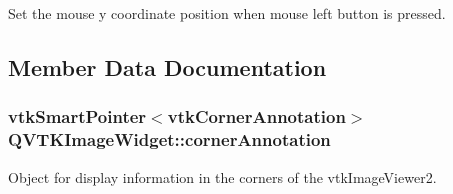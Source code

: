 Set the mouse y coordinate position when mouse left button is pressed. 



\subsection{Member Data Documentation}
\hypertarget{class_q_v_t_k_image_widget_a4c5a9fab33dfc90a74abe775fb6c50f5}{
\subsubsection[{corner\-Annotation}]{\setlength{\rightskip}{0pt plus 5cm}vtk\-Smart\-Pointer$<$vtk\-Corner\-Annotation$>$ {\bf Q\-V\-T\-K\-Image\-Widget\-::corner\-Annotation}}}\label{d8/dd7/class_q_v_t_k_image_widget_a4c5a9fab33dfc90a74abe775fb6c50f5}


Object for display information in the corners of the vtk\-Image\-Viewer2. 

